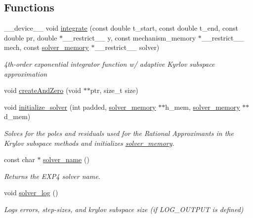 \subsection*{Functions}
\begin{DoxyCompactItemize}
\item 
\+\_\+\+\_\+device\+\_\+\+\_\+ void \hyperlink{namespaceexp4cu_aac3abe15ef50061cdfe24ed7d9d64b7a}{integrate} (const double t\+\_\+start, const double t\+\_\+end, const double pr, double $\ast$\+\_\+\+\_\+restrict\+\_\+\+\_\+ y, const mechanism\+\_\+memory $\ast$\+\_\+\+\_\+restrict\+\_\+\+\_\+ mech, const \hyperlink{structexp4cu_1_1solver__memory}{solver\+\_\+memory} $\ast$\+\_\+\+\_\+restrict\+\_\+\+\_\+ solver)
\begin{DoxyCompactList}\small\item\em 4th-\/order exponential integrator function w/ adaptive Kyrlov subspace approximation \end{DoxyCompactList}\item 
void \hyperlink{namespaceexp4cu_abcdabb48b002afcaf4520f85bb06c156}{create\+And\+Zero} (void $\ast$$\ast$ptr, size\+\_\+t size)
\item 
void \hyperlink{namespaceexp4cu_aa57e5681ad1b4e46c67d24d12d64e435}{initialize\+\_\+solver} (int padded, \hyperlink{structexp4cu_1_1solver__memory}{solver\+\_\+memory} $\ast$$\ast$h\+\_\+mem, \hyperlink{structexp4cu_1_1solver__memory}{solver\+\_\+memory} $\ast$$\ast$d\+\_\+mem)
\begin{DoxyCompactList}\small\item\em Solves for the poles and residuals used for the Rational Approximants in the Krylov subspace methods and initializes \hyperlink{structexp4cu_1_1solver__memory}{solver\+\_\+memory}. \end{DoxyCompactList}\item 
const char $\ast$ \hyperlink{namespaceexp4cu_ad9fad26aa869ef1c6b7fc061e1e6abc3}{solver\+\_\+name} ()
\begin{DoxyCompactList}\small\item\em Returns the E\+X\+P4 solver name. \end{DoxyCompactList}\item 
void \hyperlink{namespaceexp4cu_a042f555823c136890f60ab28454daf9e}{solver\+\_\+log} ()
\begin{DoxyCompactList}\small\item\em Logs errors, step-\/sizes, and krylov subspace size (if L\+O\+G\+\_\+\+O\+U\+T\+P\+UT is defined) \end{DoxyCompactList}\item 
$$
\end{DoxyCompactItemize}
